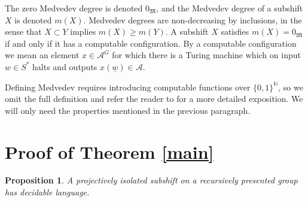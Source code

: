 \documentclass[a4paper,oneside]{amsart}
\renewcommand{\(}{\begin{dmath*}}
\renewcommand{\)}{\end{dmath*}}
\newtheorem{proposition}[theorem]{Proposition}
\theoremstyle{definition}
\newcommand{\N}{\mathbb{N}}
\newcommand{\A}{\mathcal{A}}
\begin{document}
The zero Medvedev degree is denoted $0_{\mathfrak M}$, and the Medvedev degree of a subshift $X$ is denoted $m(X)$. Medvedev degrees are non-decreasing by inclusions, in the sense that $X\subset Y$ implies $m(X)\geq m(Y)$.  A subshift $X$ satisfies  $m(X)=0_{\mathfrak M}$ if and only if it has a computable configuration. By a computable configuration we mean an element $x\in \A^G$ for which there is a Turing machine which on input $w\in S^\ast$ halts and outputs $x(\underline{w})\in\A$.

Defining Medvedev requires introducing computable functions over $\{0,1\}^\N$,  so we omit the full definition and refer the reader to \cite[\S 3]{barbieri_medvedev_2024} for a more detailed exposition. We will only need the properties mentioned in the previous paragraph. 
\section{Proof of Theorem \ref{main}}
\begin{proposition}\label{prop:projectively-isolated-decidable-language}
A projectively isolated subshift on a recursively presented group has decidable language. 
\end{proposition}
\end{document}
